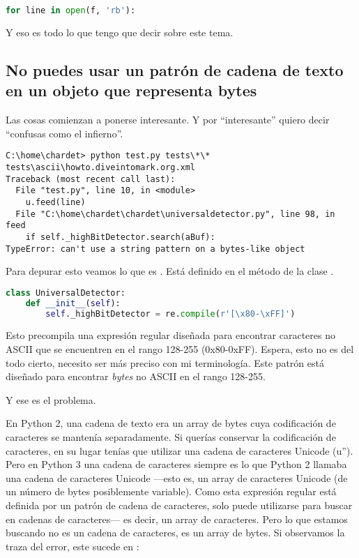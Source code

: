 \begin{lstlisting}[language=Python,breaklines=true]
for line in open(f, 'rb'):
\end{lstlisting}

Y eso es todo lo que tengo que decir sobre este tema.

\subsection{No puedes usar un patrón de cadena de texto en un objeto que representa bytes}

Las cosas comienzan a ponerse interesante. Y por ``interesante'' quiero decir ``confusas como el infierno''.


\noindent\begin{minipage}{\textwidth}
\begin{lstlisting}[breaklines=true]
C:\home\chardet> python test.py tests\*\*
tests\ascii\howto.diveintomark.org.xml
Traceback (most recent call last):
  File "test.py", line 10, in <module>
    u.feed(line)
  File "C:\home\chardet\chardet\universaldetector.py", line 98, in feed
    if self._highBitDetector.search(aBuf):
TypeError: can't use a string pattern on a bytes-like object
\end{lstlisting}
\end{minipage}

Para depurar esto veamos lo que es . Está definido en el método  de la clase .


\begin{lstlisting}[language=Python,breaklines=true]
class UniversalDetector:
    def __init__(self):
        self._highBitDetector = re.compile(r'[\x80-\xFF]')
\end{lstlisting}

Esto precompila una expresión regular diseñada para encontrar caracteres no ASCII que se encuentren en el rango 128-255 (0x80-0xFF). Espera, esto no es del todo cierto, necesito ser más preciso con mi terminología. Este patrón está diseñado para encontrar \emph{bytes} no ASCII en el rango 128-255.

Y ese es el problema.

En Python 2, una cadena de texto era un array de bytes cuya codificación de caracteres se mantenía separadamente. Si querías conservar la codificación de caracteres, en su lugar tenías que utilizar una cadena de caracteres Unicode (u''). Pero en Python 3 una cadena de caracteres siempre es lo que Python 2 llamaba una cadena de caracteres Unicode ---esto es, un array de caracteres Unicode (de un número de bytes posiblemente variable). Como esta expresión regular está definida por un patrón de cadena de caracteres, solo puede utilizarse para buscar en cadenas de caracteres--- es decir, un array de caracteres. Pero lo que estamos buscando no es un cadena de caracteres, es un array de bytes. Si observamos la traza del error, este sucede en :

